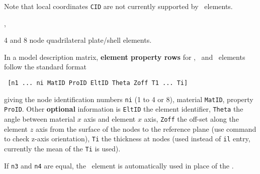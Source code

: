 Note that local coordinates {\tt CID} are not currently supported by \massb\ elements.


\femesh, \feplot

\begin{OPENFEM}


\end{OPENFEM}
\begin{SDT}

\begin{latexonly}

\end{latexonly}
\end{SDT}


4 and 8 node quadrilateral plate/shell elements.



In a model description matrix, {\bf element property rows} for \quada, \quadb\ and \quadc\ elements follow the standard format

\begin{verbatim}
 [n1 ... ni MatID ProID EltID Theta Zoff T1 ... Ti] 
\end{verbatim}


giving the node identification numbers {\tt ni} (1 to 4 or 8), material {\tt MatID}, property {\tt ProID}. Other {\bf optional} information is {\tt EltID} the element identifier, {\tt Theta} the angle between material $x$ axis and element $x$ axis, {\tt Zoff} the off-set along the element $z$ axis from the surface of the nodes to the reference plane (use  command to check z-axis orientation), {\tt Ti} the thickness at nodes (used instead of {\tt il} entry, currently the mean of the {\tt Ti} is used). \par

If {\tt n3} and {\tt n4} are equal, the \triaa\ element is automatically used in place of the \quada.

